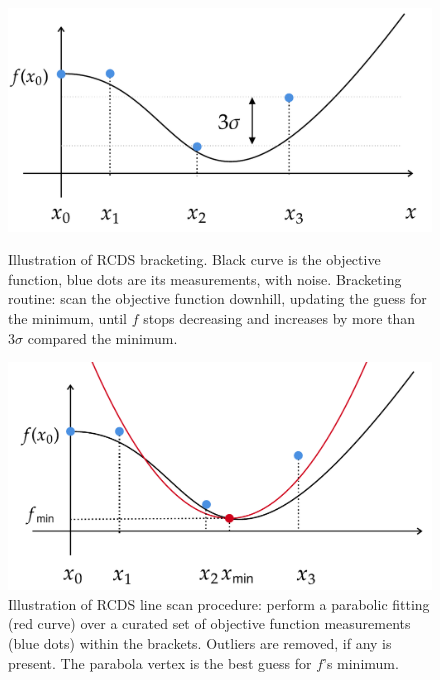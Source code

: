 \begin{figure}
    \begin{minipage}{0.48\textwidth}
        \centering
        \includegraphics[width=\textwidth]{Images/bracketing.pdf}
        \caption[Illustration of RCDS bracketing.]{Illustration of RCDS bracketing. Black curve is the objective function, blue dots are its measurements, with noise. Bracketing routine: scan the objective function downhill, updating the guess for the minimum, until $f$ stops decreasing and increases by more than $3\sigma$ compared the minimum.}
        \label{fig:bracketing}
    \end{minipage}
    \hfill
    \begin{minipage}{0.48\textwidth}
        \centering
        \includegraphics[width=\textwidth]{Images/linescan.pdf}
        \caption[Illustration of RCDS line-scan procedure.]{Illustration of RCDS line scan procedure: perform a parabolic fitting (red curve) over a curated set of objective function measurements (blue dots) within the brackets. Outliers are removed, if any is present. The parabola vertex is the best guess for $f$'s minimum.}
    \end{minipage}
\end{figure}
